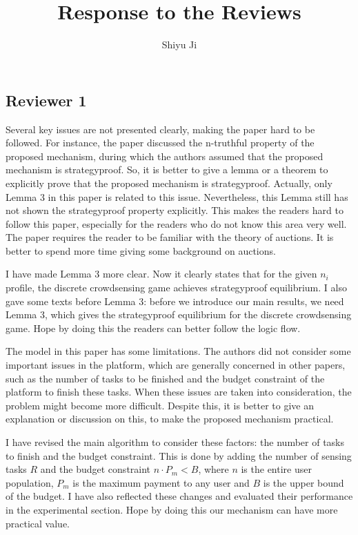 \documentclass[a4paper,11pt]{exam}
\begin{document}
\title{Response to the Reviews}
\author{Shiyu Ji}
\maketitle

\begin{questions}
\section{Reviewer 1}
\question Several key issues are not presented clearly, making the paper hard to be followed. For instance, the paper discussed the n-truthful property of the proposed mechanism, during which the authors assumed that the proposed mechanism is strategyproof. So, it is better to give a lemma or a theorem to explicitly prove that the proposed mechanism is strategyproof. Actually, only Lemma 3 in this paper is related to this issue. Nevertheless, this Lemma still has not shown the strategyproof property explicitly. This makes the readers hard to follow this paper, especially for the readers who do not know this area very well. The paper requires the reader to be familiar with the theory of auctions. It is better to spend more time giving some background on auctions. 
\begin{solution}
I have made Lemma 3 more clear. Now it clearly states that for the given $n_i$ profile, the discrete crowdsensing game achieves strategyproof equilibrium. I also gave some texts before Lemma 3: before we introduce our main results, we need Lemma 3, which gives the strategyproof equilibrium for the discrete crowdsensing game. Hope by doing this the readers can better follow the logic flow. 
\end{solution}

\question The model in this paper has some limitations. The authors did not consider some important issues in the platform, which are generally concerned in other papers, such as the number of tasks to be finished and the budget constraint of the platform to finish these tasks. When these issues are taken into consideration, the problem might become more difficult. Despite this, it is better to give an explanation or discussion on this, to make the proposed mechanism practical. 
\begin{solution}
I have revised the main algorithm to consider these factors: the number of tasks to finish and the budget constraint. This is done by adding the number of sensing tasks $R$ and the budget constraint $n\cdot P_m < B$, where $n$ is the entire user population, $P_m$ is the maximum payment to any user and $B$ is the upper bound of the budget. I have also reflected these changes and evaluated their performance in the experimental section. Hope by doing this our mechanism can have more practical value.
\end{solution}


\end{questions}
\end{document}
